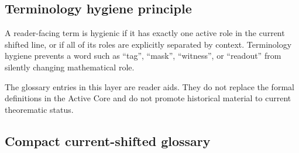 \subsection{Terminology hygiene principle}
\label{subsec:v409-terminology-hygiene-principle}

\begin{definition}
\label{def:v409-terminology-hygiene-principle}
A reader-facing term is hygienic if it has exactly one active role in the
current shifted line, or if all of its roles are explicitly separated by context.
Terminology hygiene prevents a word such as ``tag'', ``mask'', ``witness'', or
``readout'' from silently changing mathematical role.
\end{definition}

\begin{remark}
\label{rem:v409-glossary-entries-reader-aids}
The glossary entries in this layer are reader aids. They do not replace the
formal definitions in the Active Core and do not promote historical material to
current theorematic status.
\end{remark}

\subsection{Compact current-shifted glossary}
\label{subsec:v409-compact-current-shifted-glossary}

